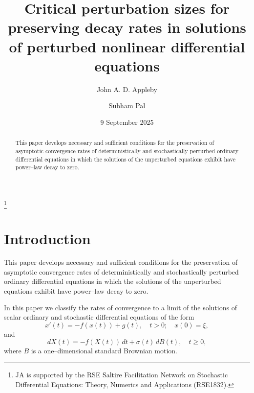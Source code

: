 \documentclass[a4paper,10pt,reqno]{amsart}
\numberwithin{equation}{section}
\theoremstyle{definition}
\theoremstyle{remark}
\DeclareMathOperator{\1}{\mathbbm 1}
\begin{document}
	
	\title[Perturbed Linear ODEs and SDEs]
	{Critical perturbation sizes for preserving decay rates in solutions of perturbed nonlinear differential equations}
	
	\author{John A. D. Appleby}
	\address{School of Mathematical
		Sciences, Dublin City University, Glasnevin, Dublin 9, Ireland}
	
	\author{Subham Pal}
	\address{School of Mathematical
		Sciences, Dublin City University, Glasnevin, Dublin 9, Ireland}
	
	\thanks{JA is supported by the RSE Saltire Facilitation Network on Stochastic Differential Equations: Theory, Numerics and Applications (RSE1832).} 
	\date{9 September 2025}
	
	\begin{abstract}
		This paper develops necessary and sufficient conditions for the preservation of asymptotic convergence rates of deterministically and stochastically perturbed ordinary differential equations in which the solutions of the unperturbed equations exhibit have power--law  decay to zero.   
	\end{abstract}
	
	\maketitle
	
	\section{Introduction} 
	This paper develops necessary and sufficient conditions for the preservation of asymptotic convergence rates of deterministically and stochastically perturbed ordinary differential equations in which the solutions of the unperturbed equations exhibit have power--law  decay to zero. 
	
	In this paper we classify the rates of convergence to a limit of the solutions of scalar ordinary and stochastic differential equations
	of the form 
	\begin{equation} \label{eq.odepert}
		x'(t)=-f(x(t))+g(t), \quad t>0; \quad x(0)=\xi,
	\end{equation}
	and 
	\begin{equation} \label{eq.sde}
		dX(t)=-f(X(t))\,dt + \sigma(t)\,dB(t), \quad t\geq 0,
	\end{equation}
	where $B$ is a one--dimensional standard Brownian motion. 
	
\end{document}
